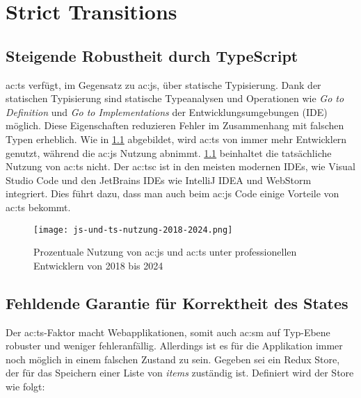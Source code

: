 \chapter{Strict Transitions} \label{ch:strict-transitions}

\section{Steigende Robustheit durch TypeScript}

\acrlong{ac:ts} verfügt, im Gegensatz zu \acrlong{ac:js}, über statische Typisierung. Dank der statischen Typisierung sind statische Typeanalysen und Operationen wie \textit{Go to Definition} und \textit{Go to Implementations} der Entwicklungsumgebungen (IDE) möglich. Diese Eigenschaften reduzieren Fehler im Zusammenhang mit falschen Typen erheblich. Wie in \ref{fig:js-und-ts-nutzung-2018-2024} abgebildet, wird \acrlong{ac:ts} von immer mehr Entwicklern genutzt, während die \acrlong{ac:js} Nutzung abnimmt. \ref{fig:js-und-ts-nutzung-2018-2024} beinhaltet die tatsächliche Nutzung von \acrshort{ac:ts} nicht. Der \acrlong{ac:tsc} ist in den meisten modernen IDEs, wie Visual Studio Code und den JetBrains IDEs wie IntelliJ IDEA und WebStorm integriert. Dies führt dazu, dass man auch beim \acrlong{ac:js} Code einige Vorteile von \acrlong{ac:ts} bekommt.\cite{typeScriptDocumentary}

\begin{figure}[H]
  \texttt{[image: js-und-ts-nutzung-2018-2024.png]}
  \caption{Prozentuale Nutzung von \acrlong{ac:js} und \acrlong{ac:ts} unter professionellen Entwicklern von 2018 bis 2024}
  \label{fig:js-und-ts-nutzung-2018-2024}
\end{figure}


\section {Fehldende Garantie für Korrektheit des States}

Der \acrlong{ac:ts}-Faktor macht Webapplikationen, somit auch \acrlong{ac:sm} auf Typ-Ebene robuster und weniger fehleranfällig. Allerdings ist es für die Applikation immer noch möglich in einem falschen Zustand zu sein. Gegeben sei ein Redux Store, der für das Speichern einer Liste von \textit{items} zuständig ist. Definiert wird der Store wie folgt:


